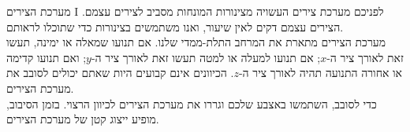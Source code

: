 \begin{surferPage}{מערכת הצירים I}
לפניכם מערכת צירים העשויה מצינורות המונחות מסביב לצירים עצמם. הצירים עצמם דקים לאין שיעור, ואנו משתמשים בצינורות כדי שתוכלו לראותם.\\
מערכת הצירים מתארת את המרחב התלת-ממדי שלנו. אם תנועו שמאלה או ימינה, תעשו זאת לאורך ציר ה-$x$; אם תנועו למעלה או למטה תעשו זאת לאורך ציר ה-$y$; ואם תנועו קדימה או אחורה התנועה תהיה לאורך ציר ה-$z$. הכיוונים אינם קבועים היות שאתם יכולים לסובב את מערכת הצירים.\\
\vspace{0,3cm}
כדי לסובב, השתמשו באצבע שלכם וגררו את מערכת הצירים לכיוון הרצוי. בזמן הסיבוב, מופיע ייצוג קטן של מערכת הצירים.
\end{surferPage}

